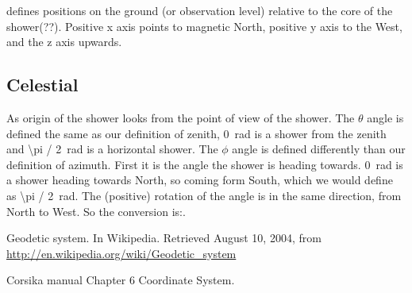 \corsika defines positions on the ground (or observation level) relative
to the core of the shower(??). Positive x axis points to magnetic North,
positive y axis to the West, and the z axis upwards.


\subsection{Celestial}

As origin of the shower \corsika looks from the point of view of the
shower. The $\theta$ angle is defined the same as our definition of
zenith, \SI{0}{\radian} is a shower from the zenith and
\SI{\pi / 2}{\radian} is a horizontal shower. The $\phi$ angle is
defined differently than our definition of azimuth. First it is the
angle the shower is heading towards. \SI{0}{\radian} is a shower heading
towards North, so coming form South, which we would define as
\SI{\pi / 2}{\radian}. The (positive) rotation of the angle is
in the same direction, from North to West. So the conversion is:.




\begin{thebibliography}{9}

Geodetic system. In Wikipedia. Retrieved August 10, 2004,
from \url{http://en.wikipedia.org/wiki/Geodetic_system}

Corsika manual Chapter 6 Coordinate System.

\end{thebibliography}
